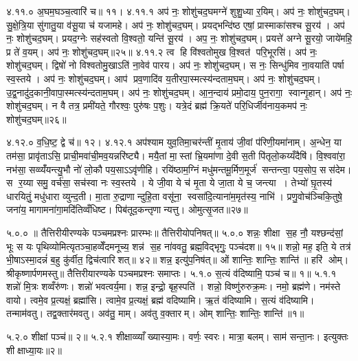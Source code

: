 ४.११.०
अ॒घम॒घञ्च॒त्वारि॑ च॥ ११।
४.११.१
अप॑ नः॒ शोशु॑चद॒घमग्ने॑ शुशु॒ध्या र॒यिम्। अप॑ नः॒ शोशु॑चद॒घम्। सु॒क्षे॒त्रि॒या सु॑गातु॒या व॑सू॒या च॑ यजामहे। अप॑ नः॒ शोशु॑चद॒घम्। प्रयद्भन्दि॑ष्ठ एषां॒ प्रास्माका॑सश्च सू॒रय॑। अप॑ नः॒ शोशु॑चद॒घम्। प्रयद॒ग्नेः सह॑स्वतो वि॒श्वतो॒ यन्ति॑ सू॒रय॑। अप॒ नः॒ शोशु॑चद॒घम्। प्रयत्ते॑ अग्ने सू॒रयो॒ जाये॑महि॒ प्र ते॑ व॒यम्। अप॑ नः॒ शोशु॑चद॒घम्॥२५॥
४.११.२
त्व हि वि॑श्वतोमुख वि॒श्वत॑ परि॒भूरसि॑। अप॑ नः॒ शोशु॑चद॒घम्। द्विषो॑ नो विश्वतोमु॒खाऽति॑ ना॒वेव॑ पारय। अप॑ नः॒ शोशु॑चद॒घम्। स नः॒ सिन्धु॑मिव ना॒वयाति॑ पर्\mbox{}षा स्व॒स्तये। अप॑ नः॒ शोशु॑चद॒घम्। आप॑ प्रव॒णादि॑व य॒तीरपा॒स्मत्स्य॑न्दताम॒घम्। अप॑ नः॒ शोशु॑चद॒घम्। उ॒द्व॒नादु॑द॒कानी॒वापा॒स्मत्स्य॑न्दताम॒घम्। अप॑ नः॒ शोशु॑चद॒घम्। आ॒न॒न्दाय॑ प्रमो॒दाय॒ पुन॒रागा॒ स्वान्गृ॒हान्। अप॑ नः॒ शोशु॑चद॒घम्। न वै तत्र॒ प्रमी॑यते॒ गौरश्वः॒ पुरु॑षः प॒शुः। यत्रे॒दं ब्रह्म॑ क्रि॒यते॑ परि॒धिर्जीव॑नाय॒कमप॑ नः॒ शोशु॑चद॒घम्॥२६॥
\anuvakamend

४.१२.०
व॒धि॒ष्ट॒ द्वे च॑॥ १२।
४.१२.१
अप॑श्याम युव॒तिमा॒चर॑न्तीं मृ॒ताय॑ जी॒वां प॑रिणी॒यमा॑नाम्। अ॒न्धेन॒ या तम॑सा॒ प्रावृ॑ताऽसि॒ प्राची॒मवा॑ची॒मव॒यन्नरि॑ष्ट्यै। मयै॒तां मा॒स्तां भ्रि॒यमा॑णा दे॒वी स॒ती पि॑तृलो॒कय्यँदैषि॑। वि॒श्ववा॑रा॒ नभ॑सा॒ सव्व्यँ॑यन्त्यु॒भौ नो॑ लो॒कौ पय॒साऽऽवृ॑णीहि। रयि॑ष्ठाम॒ग्निं मधु॑मन्तमू॒र्मिण॒मूर्ज॑ सन्तन्त्वा॒ पय॒सोप॒ सस॑देम। स र॒य्या समु॒ वर्च॑सा॒ सच॑स्वा नः स्व॒स्तये। ये जी॒वा ये च॑ मृ॒ता ये जा॒ता ये च॒ जन्त्या। तेभ्यो॑ घ़ृ॒तस्य॑ धारयितुं॒ मधु॑धारा व्युन्द॒ती। मा॒ता रु॒द्राणान्दुहि॒ता वसू॑ना॒ स्वसा॑दि॒त्याना॑म॒मृत॑स्य॒ नाभि॑। प्रणु॒वोच॑ञ्चिकि॒तुषे॒ जना॑य॒ मागामना॑गा॒मदि॑तिव्वँधिष्ट। पिब॑तूद॒कन्तृणान्यत्तु। ओमुत्सृ॒जत॥२७॥

\setcounter{anuvakam}{0}
५.०.०
॥ तैत्तिरीयीरण्यके पञ्चमप्रश्नः प्रारम्भः॥ तैत्तिरीयोपनिषत्॥
५.०.०
शन्नः॒ शीक्षा स॒ह नौ॒ यश्छन्द॑सां॒ भूः स यः पृथिव्योमित्यृतञ्चा॒हव्वेँदमनूच्य॒ शन्न॑ स॒ह ना॑ववतु॒ ब्रह्म॒विद्भृगुः॒ पञ्च॑दश॥ १५॥ शन्नो॒ मह॒ इति॒ ये तत्र॑ भी॒षाऽस्मा॒दन्नं॑ ब॒हु कु॑र्वीत॒ द्विच॑त्वारिशत्॥ ४२॥ शन्न॒ इत्यु॑प॒निष॑त्॥ ओं शान्तिः॒ शान्तिः॒ शान्ति॑॥ हरि॑ ओम्। श्रीकृष्णार्पणमस्तु॥ तैत्तिरीयारण्यके पञ्चमप्रश्नः समाप्तः।
५.१.०
स॒त्यं व॑दिष्यामि॒ पञ्च॑ च॥ १॥
५.१.१
शन्नो॑ मि॒त्रः  शव्वँरु॑णः। शन्नो॑ भवत्वर्य॒मा। शन्न॒ इन्द्रो॒ बृह॒स्पति॑। शन्नो॒ विष्णु॑रुरुक्र॒मः। नमो॒ ब्रह्म॑णे। नम॑स्ते वायो। त्वमे॒व प्र॒त्यक्षं॒ ब्रह्मा॑सि। त्वामे॒व प्र॒त्यक्षं॒ ब्रह्म॑ वदिष्यामि। ऋ॒तं व॑दिष्यामि। स॒त्यं व॑दिष्यामि। तन्माम॑वतु। तद्व॒क्तार॑मवतु। अव॑तु॒ माम्। अव॑तु व॒क्तारम्। ओम् शान्तिः॒ शान्तिः॒ शान्ति॑॥१॥
\anuvakamend

५.२.०
शीक्षां पञ्च॑॥ २॥
५.२.१
शीक्षाव्व्याँख्यास्या॒मः। वर्णः॒ स्वरः। मात्रा॒ बलम्। साम॑ सन्ता॒नः। इत्युक्तः  शीक्षाध्या॒यः॥२॥
\anuvakamend

